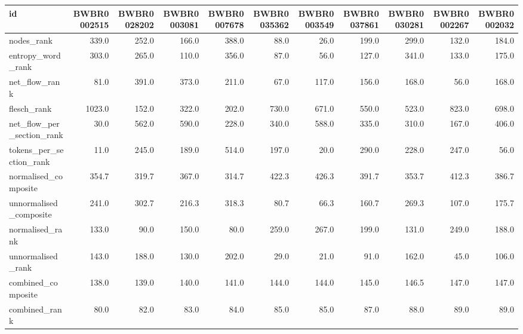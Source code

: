 \begin{tabular}{lrrrrrrrrrr}
\toprule
id & BWBR0002515 & BWBR0028202 & BWBR0003081 & BWBR0007678 & BWBR0035362 & BWBR0003549 & BWBR0037861 & BWBR0030281 & BWBR0002267 & BWBR0002032 \\
\midrule
nodes\_rank & 339.0 & 252.0 & 166.0 & 388.0 & 88.0 & 26.0 & 199.0 & 299.0 & 132.0 & 184.0 \\
\cline{1-11}
entropy\_word\_rank & 303.0 & 265.0 & 110.0 & 356.0 & 87.0 & 56.0 & 127.0 & 341.0 & 133.0 & 175.0 \\
\cline{1-11}
net\_flow\_rank & 81.0 & 391.0 & 373.0 & 211.0 & 67.0 & 117.0 & 156.0 & 168.0 & 56.0 & 168.0 \\
\cline{1-11}
flesch\_rank & 1023.0 & 152.0 & 322.0 & 202.0 & 730.0 & 671.0 & 550.0 & 523.0 & 823.0 & 698.0 \\
\cline{1-11}
net\_flow\_per\_section\_rank & 30.0 & 562.0 & 590.0 & 228.0 & 340.0 & 588.0 & 335.0 & 310.0 & 167.0 & 406.0 \\
\cline{1-11}
tokens\_per\_section\_rank & 11.0 & 245.0 & 189.0 & 514.0 & 197.0 & 20.0 & 290.0 & 228.0 & 247.0 & 56.0 \\
\cline{1-11}
normalised\_composite & 354.7 & 319.7 & 367.0 & 314.7 & 422.3 & 426.3 & 391.7 & 353.7 & 412.3 & 386.7 \\
\cline{1-11}
unnormalised\_composite & 241.0 & 302.7 & 216.3 & 318.3 & 80.7 & 66.3 & 160.7 & 269.3 & 107.0 & 175.7 \\
\cline{1-11}
normalised\_rank & 133.0 & 90.0 & 150.0 & 80.0 & 259.0 & 267.0 & 199.0 & 131.0 & 249.0 & 188.0 \\
\cline{1-11}
unnormalised\_rank & 143.0 & 188.0 & 130.0 & 202.0 & 29.0 & 21.0 & 91.0 & 162.0 & 45.0 & 106.0 \\
\cline{1-11}
combined\_composite & 138.0 & 139.0 & 140.0 & 141.0 & 144.0 & 144.0 & 145.0 & 146.5 & 147.0 & 147.0 \\
\cline{1-11}
combined\_rank & 80.0 & 82.0 & 83.0 & 84.0 & 85.0 & 85.0 & 87.0 & 88.0 & 89.0 & 89.0 \\
\cline{1-11}
\bottomrule
\end{tabular}

